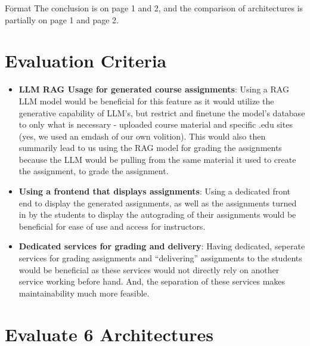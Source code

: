 \documentclass[12pt]{article}
\begin{document}
\maketitlepage

\begin{aside}{Format}
    The conclusion is on page 1 and 2, and the comparison of architectures is partially on page 1 and page 2.
\end{aside}

\section{Evaluation Criteria}

\begin{itemize}
    \item \textbf{LLM RAG Usage for generated course assignments}: Using a RAG LLM model would be beneficial 
    for this feature as it would utilize the generative capability of LLM's, but restrict and finetune
    the model's database to only what is necessary - uploaded course material and specific .edu sites 
    (yes, we used an emdash of our own volition). This would also then summarily lead to us 
    using the RAG model for grading the assignments because the LLM would be pulling from the same 
    material it used to create the assignment, to grade the assignment.
    \item \textbf{Using a frontend that displays assignments}: Using a dedicated front end 
    to display the generated assignments, as well as the assignments turned in by the students to display
    the autograding of their assignments would be beneficial for ease of use and access for instructors.
    \item \textbf{Dedicated services for grading and delivery}: Having dedicated, seperate services 
    for grading assignments and ``delivering'' assignments to the students would be beneficial as 
    these services would not directly rely on another service working before hand. And, the separation 
    of these services makes maintainability much more feasible.
\end{itemize}

\section{Evaluate 6 Architectures}
\end{document}
